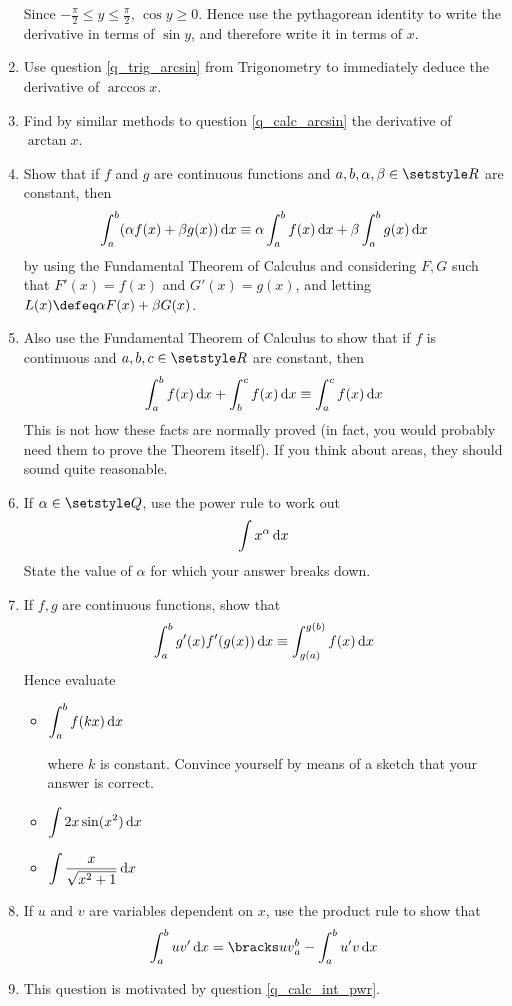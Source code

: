 \begin{enumerate}
  Since \(-\frac \pi 2 \le y \le \frac \pi 2\), \(\cos y \ge 0\). Hence use the
  pythagorean identity to write the derivative in terms of \(\sin y\), and
  therefore write it in terms of \(x\).
 \item
  Use question \ref{q_trig_arcsin} from Trigonometry to immediately deduce the
  derivative of \(\arccos x\).
 \item
  Find by similar methods to question \ref{q_calc_arcsin} the derivative of
  \(\arctan x\).
 \item
  Show that if \(f\) and \(g\) are continuous functions and
  \(a, b, \alpha, \beta \in \Reals\) are constant, then
  \begin{equation*}
   \integ[a]<b>{(\alpha f(x) + \beta g(x))}{x} \equiv
   \alpha \integ[a]<b>{f(x)}{x} +
   \beta  \integ[a]<b>{g(x)}{x}
  \end{equation*}
  by using the Fundamental Theorem of Calculus and considering \(F, G\) such
  that \(F'(x) = f(x)\) and \(G'(x) = g(x)\), and letting
  \(L(x) \defeq \alpha F(x) + \beta G(x)\).
 \item
  Also use the Fundamental Theorem of Calculus to show that if \(f\) is
  continuous and \(a, b, c \in \Reals\) are constant, then
  \begin{equation*}
   \integ[a]<b>{f(x)}{x} + \integ[b]<c>{f(x)}{x} \equiv
   \integ[a]<c>{f(x)}{x}
  \end{equation*}
  This is not how these facts are normally proved (in fact, you would probably
  need them to prove the Theorem itself). If you think about areas, they should
  sound quite reasonable.
 \item \label{q_calc_int_pwr}
  If \(\alpha \in \Rationals\), use the power rule to work out
  \begin{equation*}
   \integ{x^\alpha}{x}
  \end{equation*}
  State the value of \(\alpha\) for which your answer breaks down.
 \item
  If \(f, g\) are continuous functions, show that
  \begin{equation*}
   \integ[a]<b>{g'(x) f'(g(x))}{x} \equiv
   \integ[g(a)]<g(b)>{f(x)}{x}
  \end{equation*}
  Hence evaluate
  \begin{itemize}
   \item \(\displaystyle
    \integ[a]<b>{f(kx)}{x}
    \)

    where \(k\) is constant. Convince yourself by means of a sketch that your
    answer is correct.
   \item \(\displaystyle
    \integ{2x \sin(x^2)}{x}
    \)
   \item \(\displaystyle
    \integ{\frac x{\sqrt{x^2 + 1}}}{x}
    \)
  \end{itemize}
 \item
  If \(u\) and \(v\) are variables dependent on \(x\), use the product rule to
  show that
  \begin{equation*}
   \integ[a]<b>{uv'}{x} = \eval{a}{b}{uv} - \integ[a]<b>{u'v}{x}
  \end{equation*}
 \item
  This question is motivated by question \ref{q_calc_int_pwr}.


\end{enumerate}
